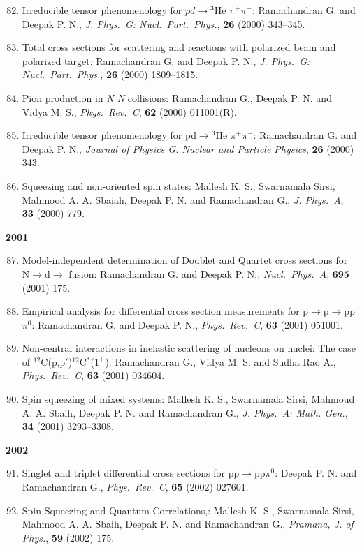 \begin{enumerate}
\setcounter{enumi}{81}
\item Irreducible tensor phenomenology for $pd\to {}^{3}$He $\pi^{+}\pi^{-}$: Ramachandran G. and Deepak P. N., \textit{J. Phys.\ G: Nucl.\ Part.\ Phys.}, {\bf 26} (2000) 343--345.
\item Total cross sections for scattering and reactions with polarized beam and polarized target: Ramachandran G. and Deepak P. N., \textit{J. Phys.\ G: Nucl.\ Part.\ Phys.}, {\bf 26} (2000) 1809--1815.
\item Pion production in \textit{N N} collisions: Ramachandran G., Deepak P. N. and Vidya M. S., \textit{Phys.\ Rev.\ C}, {\bf 62} (2000) 011001(R).
\item Irreducible tensor phenomenology for pd$\to{}^{3}$He $\pi^{+}\pi^{-}$: Ramachandran G. and Deepak P. N., \textit{Journal of Physics G: Nuclear and Particle Physics}, {\bf 26} (2000) 343.
\item Squeezing and non-oriented spin states: Mallesh K. S., Swarnamala Sirsi, Mahmood A. A. Sbaiah, Deepak P. N. and Ramachandran G., \textit{J. Phys.\ A}, {\bf 33} (2000) 779.
\end{enumerate}
\textbf{2001}
\begin{enumerate}
\setcounter{enumi}{86}
\item Model-independent determination of Doublet and Quartet cross sections for N$\to$d$\to$ fusion: Ramachandran G. and Deepak P. N., \textit{Nucl.\ Phys.\  A}, {\bf 695} (2001) 175.
\item Empirical analysis for differential cross section measurements for p$\to$p$\to$pp$\pi^{0}$: Ramachandran G. and Deepak P. N., \textit{Phys.\ Rev.\ C}, {\bf 63} (2001) 051001.
\item Non-central interactions in inelastic scattering of nucleons on nuclei: The case of $^{12}$C(p,p$'$)$^{12}$C$^{*}$($1^{+}$): Ramachandran G., Vidya M. S. and Sudha Rao A., \textit{Phys.\ Rev.\ C}, {\bf 63} (2001) 034604.
\item Spin squeezing of mixed systems: Mallesh K. S., Swarnamala Sirsi, Mahmoud A. A. Sbaih, Deepak P. N. and Ramachandran G., \textit{J. Phys.\ A: Math. Gen.}, {\bf 34} (2001) 3293--3308.
\end{enumerate}
\textbf{2002}
\begin{enumerate}
\setcounter{enumi}{90}
\item Singlet and triplet differential cross sections for pp$\to$pp$\pi^{0}$: Deepak P. N. and Ramachandran G., \textit{Phys.\ Rev.\ C}, {\bf 65} (2002) 027601.
\item Spin Squeezing and Quantum Correlations,: Mallesh K. S., Swarnamala Sirsi, Mahmood A. A. Sbaih, Deepak P. N. and Ramachandran G., \textit{Pramana, J. of
Phys.}, {\bf 59} (2002) 175.
\end{enumerate}
